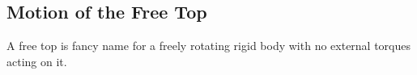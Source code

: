 \documentclass[11pt, a4paper]{article}
\newcommand{\e}{\mathbf{e}} %
\begin{document}
\iffalse
\vspace{2mm}
\textbf{Some Concepts to Know}
\begin{itemize}
	\item $ M_i = \dot{\bm{L}} \cdot \e_i \qquad \dot \e_i = \bm{\omega} \cross \e_i  $

	\item Rotation about a non-principle axis means that angular momentum changes with time.
	
	\item $ \bm{L}, \bm{\omega}, \e_{3} $ are coplanar for a symmetric free top.
	
	\item Dude. The angular velocity $ \bm{\omega} $ defines the instantaneous axis of rotation. Like, $ \bm{\omega} $ \textit{is} the axis of rotation. 
\end{itemize}
\fi


\subsection{Motion of the Free Top}
A free top is fancy name for a freely rotating rigid body with no external torques acting on it. 
\end{document}
